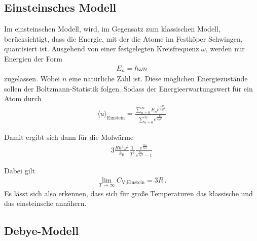 \subsection{Einsteinsches Modell}
\label{subsec:einstein}
Im einsteinschen Modell, wird, im Gegensatz zum klassischen
Modell, berücksichtigt, dass die Energie, mit
der die Atome im Festköper Schwingen, quantisiert ist.
Ausgehend von einer festgelegten Kreisfrequenz $\omega$,
werden nur Energien der Form
\begin{align*}
	E_{n} = \hbar \omega n
\end{align*}
zugelassen. Wobei $n$ eine natürliche Zahl ist.
Diese möglichen Energiezustände sollen der Boltzmann-Statistik
folgen. Sodass der Energieerwartungswert für ein Atom durch
\begin{align}
	\langle u \rangle_{\text{Einstein}} = \frac{\sum^{\infty}_{n = 0}
	E_{n} e^{\frac{-E_{n}}{k_{\text{B}} T}}}{\sum^{\infty}_{n = 0}
	e^{\frac{-E_{n}}{k_{\text{B}} T}}} \label{eqn:5}
\end{align}

Damit ergibt sich dann für die Molwärme
\begin{align}
	3 \frac{R \hbar^{2} \omega^{2}}{k_{\text{B}}} \frac{1}{T^{2}}
	\frac{e^{\frac{\hbar \omega}{k_{\text{B}} T}}}{e^{\frac{\hbar \omega}{k_{\text{B}} T}} - 1}
\end{align}

Dabei gilt
\begin{align}
	\lim_{T \rightarrow \infty} C_{\text{V,Einstein}} = 3R \, .
\end{align}
Es lässt sich also erkennen, dass sich für große Temperaturen
das klassische und das einsteinsche annähern. 
\subsection{Debye-Modell}
\label{subsec:debye}




\cite{sample}
